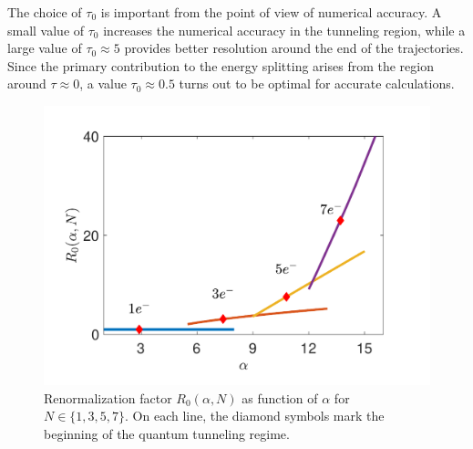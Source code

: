 \documentclass[aps, prb, floatfix, twocolumn, notitlepage, superscriptaddress, 10pt]{revtex4-2}
\def \ttau {{\tau}}
\newcommand{\n}{N}
\newcommand{\bchi}{\boldsymbol \chi}
\newcommand{\1}{{1\hspace*{-0.5ex} \textrm{l} \hspace*{0.5ex}}}
\begin{document}
The choice of $\ttau_0$ is important from the point of view of numerical accuracy. 
A small value of $\ttau_0$ increases the numerical accuracy in the tunneling region, 
while a large value of $\ttau_0\approx 5$ provides better resolution around the end of the trajectories.
Since  the primary contribution to the energy splitting arises from the region around $\ttau\approx 0$, 
a value $\ttau_0 \approx 0.5 $ turns out to be optimal for accurate calculations. 

% 
%



\begin{figure}[b!]
	\begin{center}
		\includegraphics[width=0.95\columnwidth]{Fig_perpfactors.pdf}
		 \caption{
			Renormalization factor $ R_0(\alpha, N)$ as function of $\alpha$ for $N \in  \{1, 3, 5, 7\}$. 
			On each line, the diamond symbols mark the beginning of the quantum tunneling regime.  
			}
			\label{fig:R0}		
	\end{center}
\end{figure}
\end{document}
